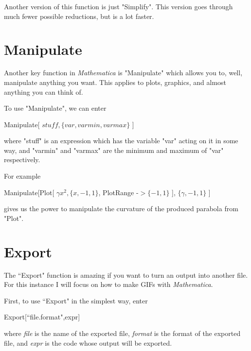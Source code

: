 \documentclass[11pt,a4paper,twoside]{article}
\begin{document}
			Another version of this function is just "Simplify".  This version goes through much fewer possible reductions, but is a lot faster.
			
		\section{Manipulate}
		
			Another key function in \textit{Mathematica} is "Manipulate" which allows you to, well, manipulate anything you want.  This applies to plots, graphics, and almost anything you can think of.
			
			To use "Manipulate", we can enter
			
			\begin{center}
			
				Manipulate[ $ stuff, \{ var, varmin, varmax \} $ ]
			
			\end{center}
			
			where "stuff" is an expression which has the variable "var" acting on it in some way, and "varmin" and "varmax" are the minimum and maximum of "var" respectively.
			
			For example
			
			\begin{center}
			
				Manipulate[Plot[ $ \gamma x^2, \{ x, -1, 1 \} $, PlotRange -$> \{ -1, 1 \} $ ], $ \{ \gamma, -1, 1 \} $ ]
			
			\end{center}
			
			gives us the power to manipulate the curvature of the produced parabola from "Plot".
			
		\section{Export}
		
			The ``Export" function is amazing if you want to turn an output into another file.  For this instance I will focus on how to make GIFs with \textit{Mathematica}.
			
			First, to use ``Export" in the simplest way, enter 
			
			\begin{center}
			
				Export[``file.format",expr]
			
			\end{center}
			
			where \textit{file} is the name of the exported file, \textit{format} is the format of the exported file, and \textit{expr} is the code whose output will be exported.
			
\end{document}
